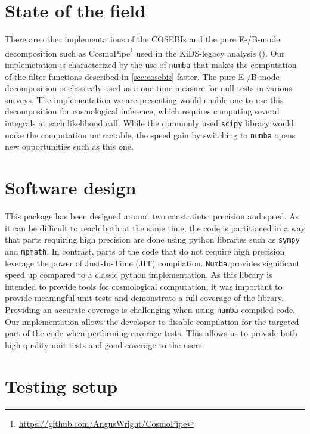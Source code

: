 \documentclass[
]{article}
\begin{document}
\section{State of the field}\label{state-of-the-field}

There are other implementations of the COSEBIs and the pure E-/B-mode
decomposition such as CosmoPipe\footnote{\url{https://github.com/AngusWright/CosmoPipe}}
used in the KiDS-legacy analysis (). Our implemetation is characterized by the use of
\texttt{numba} that makes the computation of the filter functions
described in \autoref{sec:cosebis} faster. The pure E-/B-mode
decomposition is classicaly used as a one-time measure for null tests in
various surveys. The implementation we are presenting would enable one
to use this decomposition for cosmological inference, which requires
computing several integrals at each likelihood call. While the commonly
used \texttt{scipy} library would make the computation untractable, the
speed gain by switching to \texttt{numba} opens new opportunities such
as this one.

\section{Software design}\label{software-design}

This package has been designed around two constraints: precision and
speed. As it can be difficult to reach both at the same time, the code
is partitioned in a way that parts requiring high precision are done
using python libraries such as \texttt{sympy} and \texttt{mpmath}. In
contrast, parts of the code that do not require high precision leverage
the power of Just-In-Time (JIT) compilation. \texttt{Numba} provides
significant speed up compared to a classic python implementation. As
this library is intended to provide tools for cosmological computation,
it was important to provide meaningful unit tests and demonstrate a full
coverage of the library. Providing an accurate coverage is challenging
when using \texttt{numba} compiled code. Our implementation allows the
developer to disable compilation for the targeted part of the code when
performing coverage tests. This allows us to provide both high quality
unit tests and good coverage to the users.

\section{Testing setup}\label{testing-setup}
\end{document}
